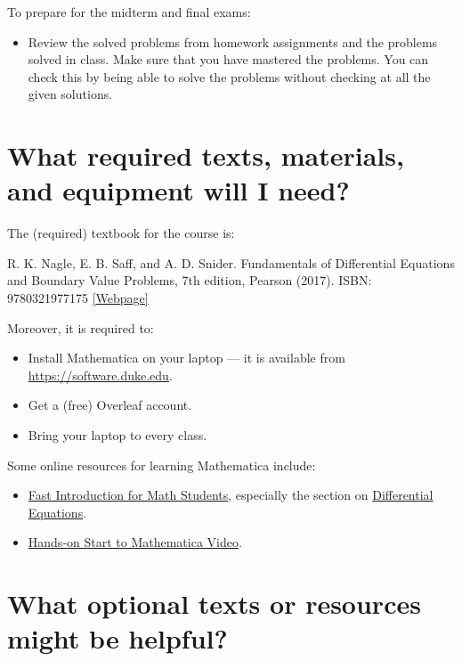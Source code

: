 \documentclass[11pt]{article}
\begin{document}
To prepare for the midterm and final exams:
\begin{itemize}[label={-},noitemsep]
\item Review the solved problems from homework assignments and the problems solved in class. Make sure that you have mastered the problems. You can check this by being able to solve the problems without checking at all the given solutions.
\end{itemize}


\section{What required texts, materials, and equipment will I need?}

The (required) textbook for the course is:

R. K. Nagle, E. B. Saff, and A. D. Snider. Fundamentals of Differential Equations and Boundary Value Problems, 7th edition, Pearson (2017). ISBN: 9780321977175
\href{https://www.pearson.com/store/p/fundamentals-of-differential-equations-and-boundary-value-problems/P100002446580}{[Webpage]}

Moreover, it is required to:
\begin{itemize}[label={-},noitemsep]
\item Install Mathematica on your laptop — it is available from \url{https://software.duke.edu}.
\item Get a (free) Overleaf account. 
\item Bring your laptop to every class.
\end{itemize}

Some online resources for learning Mathematica include:
\begin{itemize}[label={-},noitemsep]
\item \href{https://www.wolfram.com/language/fast-introduction-for-math-students/en/}{Fast Introduction for Math Students}, especially the section on \href{https://www.wolfram.com/language/fast-introduction-for-math-students/en/differential-equations/}{Differential Equations}.
\item \href{https://www.wolfram.com/wolfram-u/catalog/gen005/}{Hands-on Start to Mathematica Video}.
\end{itemize}



\section{What optional texts or resources might be helpful?}
\end{document}
